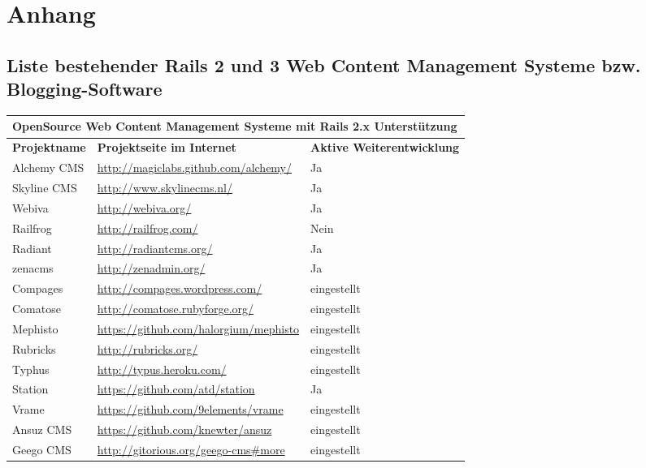\chapter{Anhang}
\section{Liste bestehender Rails 2 und 3 Web Content Management Systeme bzw. Blogging-Software}

\begin{table}[!ht]
\center
\begin{tabular}[]{|p{3cm}|p{8cm}|p{4cm}|}
\hline
\multicolumn{3}{|p{15cm}|}{\textbf{OpenSource Web Content Management Systeme mit Rails 2.x Unterstützung}}\\
\hline
\textbf{Projektname}&\textbf{Projektseite im Internet}&\textbf{Aktive Weiterentwicklung}\\
\hline
Alchemy CMS & \href{http://magiclabs.github.com/alchemy/}{http://magiclabs.github.com/alchemy/} & Ja \\
\hline
Skyline CMS & \href{http://www.skylinecms.nl/}{http://www.skylinecms.nl/} & Ja \\
\hline
Webiva & \href{http://webiva.org/}{http://webiva.org/} & Ja \\
\hline
Railfrog & \href{http://railfrog.com/}{http://railfrog.com/} & Nein \\
\hline
Radiant & \href{http://radiantcms.org/}{http://radiantcms.org/} & Ja \\
\hline
zenacms & \href{http://zenadmin.org/}{http://zenadmin.org/} & Ja \\
\hline
Compages & \href{http://compages.wordpress.com/}{http://compages.wordpress.com/} & eingestellt\\
\hline
Comatose & \href{http://comatose.rubyforge.org/}{http://comatose.rubyforge.org/} & eingestellt\\
\hline
Mephisto & \href{https://github.com/halorgium/mephisto}{https://github.com/halorgium/mephisto} & eingestellt\\
\hline
Rubricks & \href{http://rubricks.org/}{http://rubricks.org/} & eingestellt\\
\hline
Typhus & \href{http://typus.heroku.com/}{http://typus.heroku.com/} & eingestellt\\
\hline
Station & \href{https://github.com/atd/station}{https://github.com/atd/station} & Ja\\
\hline
Vrame & \href{https://github.com/9elements/vrame}{https://github.com/9elements/vrame} & eingestellt\\
\hline
Ansuz CMS & \href{https://github.com/knewter/ansuz}{https://github.com/knewter/ansuz} & eingestellt\\
\hline
Geego CMS & \href{http://gitorious.org/geego-cms\#more}{http://gitorious.org/geego-cms\#more} & eingestellt\\
\hline


\end{tabular}
\end{table}

